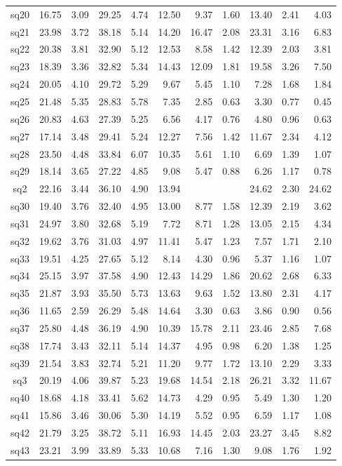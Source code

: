 {\begin{longtable}{@{}cr@{\hspace{1em}}r@{\hspace{1em}}r@{\hspace{1em}}r@{\hspace{1em}}r@{\hspace{2em}}r@{\hspace{1em}}r@{\hspace{1em}}r@{\hspace{1em}}r@{\hspace{1em}}r@{}}
sq20&16.75&3.09&29.25&4.74&12.50&9.37&1.60&13.40&2.41&4.03\\
sq21&23.98&3.72&38.18&5.14&14.20&16.47&2.08&23.31&3.16&6.83\\
sq22&20.38&3.81&32.90&5.12&12.53&8.58&1.42&12.39&2.03&3.81\\
sq23&18.39&3.36&32.82&5.34&14.43&12.09&1.81&19.58&3.26&7.50\\
sq24&20.05&4.10&29.72&5.29&9.67&5.45&1.10&7.28&1.68&1.84\\
sq25&21.48&5.35&28.83&5.78&7.35&2.85&0.63&3.30&0.77&0.45\\
sq26&20.83&4.63&27.39&5.25&6.56&4.17&0.76&4.80&0.96&0.63\\
sq27&17.14&3.48&29.41&5.24&12.27&7.56&1.42&11.67&2.34&4.12\\
sq28&23.50&4.48&33.84&6.07&10.35&5.61&1.10&6.69&1.39&1.07\\
sq29&18.14&3.65&27.22&4.85&9.08&5.47&0.88&6.26&1.17&0.78\\
sq2&22.16&3.44&36.10&4.90&13.94&&&24.62&2.30&24.62\\
sq30&19.40&3.76&32.40&4.95&13.00&8.77&1.58&12.39&2.19&3.62\\
sq31&24.97&3.80&32.68&5.19&7.72&8.71&1.28&13.05&2.15&4.34\\
sq32&19.62&3.76&31.03&4.97&11.41&5.47&1.23&7.57&1.71&2.10\\
sq33&19.51&4.25&27.65&5.12&8.14&4.30&0.96&5.37&1.16&1.07\\
sq34&25.15&3.97&37.58&4.90&12.43&14.29&1.86&20.62&2.68&6.33\\
sq35&21.87&3.93&35.50&5.73&13.63&9.63&1.52&13.80&2.31&4.17\\
sq36&11.65&2.59&26.29&5.48&14.64&3.30&0.63&3.86&0.90&0.56\\
sq37&25.80&4.48&36.19&4.90&10.39&15.78&2.11&23.46&2.85&7.68\\
sq38&17.74&3.43&32.11&5.14&14.37&4.95&0.98&6.20&1.38&1.25\\
sq39&21.54&3.83&32.74&5.21&11.20&9.77&1.72&13.10&2.29&3.33\\
sq3&20.19&4.06&39.87&5.23&19.68&14.54&2.18&26.21&3.32&11.67\\
sq40&18.68&4.18&33.41&5.62&14.73&4.29&0.95&5.49&1.30&1.20\\
sq41&15.86&3.46&30.06&5.30&14.19&5.52&0.95&6.59&1.17&1.08\\
sq42&21.79&3.25&38.72&5.11&16.93&14.45&2.03&23.27&3.45&8.82\\
sq43&23.21&3.99&33.89&5.33&10.68&7.16&1.30&9.08&1.76&1.92\\

\end{longtable}}
